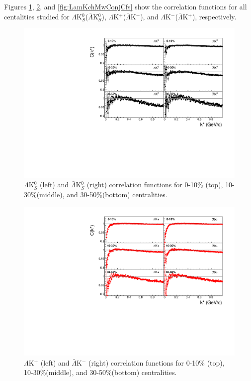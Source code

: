 \documentclass[../AnalysisNoteJBuxton.tex]{subfiles}
\begin{document}
Figures \ref{fig:cLamK0Cfs}, \ref{fig:LamKchPwConjCfs}, and \ref{fig:LamKchMwConjCfs} show the correlation functions for all centalities studied for $\Lambda$K$^{0}_{S}$($\bar{\Lambda}$K$^{0}_{S}$), $\Lambda$K$^{+}$($\bar{\Lambda}$K$^{-}$), and $\Lambda$K$^{-}$($\bar{\Lambda}$K$^{+}$), respectively.

\begin{figure}[h]
  \centering
  \includegraphics[width=\textwidth]{4_CorrelationFunctions/Figures/canKStarCfsLamK0wConj.pdf}
  \caption[$\Lambda$($\bar{\Lambda}$)K$^{0}_{S}$ Correlation Functions]{$\Lambda$K$^{0}_{S}$ (left) and $\bar{\Lambda}$K$^{0}_{S}$ (right) correlation functions for 0-10\% (top), 10-30\%(middle), and 30-50\%(bottom) centralities.}
  \label{fig:cLamK0Cfs}
\end{figure}

\begin{figure}[h]
  \centering
  \includegraphics[width=\textwidth]{4_CorrelationFunctions/Figures/canKStarCfsLamKchPwConj.pdf}
  \caption[$\Lambda$K$^{+}$ and $\bar{\Lambda}$K$^{-}$ Correlation Functions]{$\Lambda$K$^{+}$ (left) and $\bar{\Lambda}$K$^{-}$ (right) correlation functions for 0-10\% (top), 10-30\%(middle), and 30-50\%(bottom) centralities.}
  \label{fig:LamKchPwConjCfs}
\end{figure}
\end{document}
